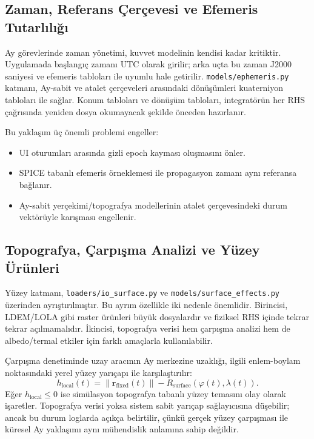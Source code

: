 \subsection{Zaman, Referans Çerçevesi ve Efemeris Tutarlılığı}

Ay görevlerinde zaman yönetimi, kuvvet modelinin kendisi kadar kritiktir. Uygulamada başlangıç zamanı UTC olarak girilir; arka uçta bu zaman J2000 saniyesi ve efemeris tabloları ile uyumlu hale getirilir. \texttt{models/ephemeris.py} katmanı, Ay-sabit ve atalet çerçeveleri arasındaki dönüşümleri kuaterniyon tabloları ile sağlar. Konum tabloları ve dönüşüm tabloları, integratörün her RHS çağrısında yeniden dosya okumayacak şekilde önceden hazırlanır.

Bu yaklaşım üç önemli problemi engeller:
\begin{itemize}
    \item UI oturumları arasında gizli epoch kayması oluşmasını önler.
    \item SPICE tabanlı efemeris örneklemesi ile propagasyon zamanı aynı referansa bağlanır.
    \item Ay-sabit yerçekimi/topografya modellerinin atalet çerçevesindeki durum vektörüyle karışması engellenir.
\end{itemize}

\subsection{Topografya, Çarpışma Analizi ve Yüzey Ürünleri}

Yüzey katmanı, \texttt{loaders/io\_surface.py} ve \texttt{models/surface\_effects.py} üzerinden ayrıştırılmıştır. Bu ayrım özellikle iki nedenle önemlidir. Birincisi, LDEM/LOLA gibi raster ürünleri büyük dosyalardır ve fiziksel RHS içinde tekrar tekrar açılmamalıdır. İkincisi, topografya verisi hem çarpışma analizi hem de albedo/termal etkiler için farklı amaçlarla kullanılabilir.

Çarpışma denetiminde uzay aracının Ay merkezine uzaklığı, ilgili enlem-boylam noktasındaki yerel yüzey yarıçapı ile karşılaştırılır:
\[
h_{\mathrm{local}}(t)
=
\|\mathbf{r}_{\mathrm{fixed}}(t)\|
-
R_{\mathrm{surface}}(\varphi(t),\lambda(t)).
\]
Eğer \(h_{\mathrm{local}}\leq 0\) ise simülasyon topografya tabanlı yüzey temasını olay olarak işaretler. Topografya verisi yoksa sistem sabit yarıçap sağlayıcısına düşebilir; ancak bu durum loglarda açıkça belirtilir, çünkü gerçek yüzey çarpışması ile küresel Ay yaklaşımı aynı mühendislik anlamına sahip değildir.

